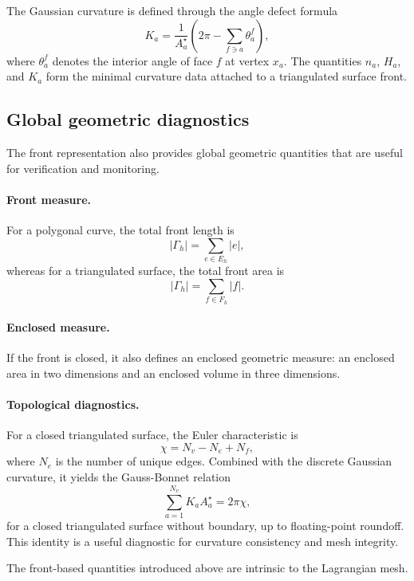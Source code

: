 \documentclass{article}
\begin{document}
The Gaussian curvature is defined through the angle defect formula
\begin{equation}
K_a
=
\frac{1}{A_a^\star}
\left(
2\pi - \sum_{f\ni a}\theta_a^f
\right),
\label{eq:gaussian_curvature}
\end{equation}
where $\theta_a^f$ denotes the interior angle of face $f$ at vertex $x_a$.
The quantities $n_a$, $H_a$, and $K_a$ form the minimal curvature data attached
to a triangulated surface front.

\subsection{Global geometric diagnostics}
\label{subsec:front_diagnostics}

The front representation also provides global geometric quantities that are useful
for verification and monitoring.

\paragraph{Front measure.}
For a polygonal curve, the total front length is
\begin{equation}
|\Gamma_h| = \sum_{e\in E_h} |e|,
\label{eq:front_length}
\end{equation}
whereas for a triangulated surface, the total front area is
\begin{equation}
|\Gamma_h| = \sum_{f\in F_h} |f|.
\label{eq:front_area}
\end{equation}

\paragraph{Enclosed measure.}
If the front is closed, it also defines an enclosed geometric measure:
an enclosed area in two dimensions and an enclosed volume in three dimensions.


\paragraph{Topological diagnostics.}
For a closed triangulated surface, the Euler characteristic is
\begin{equation}
\chi = N_v - N_e + N_f,
\label{eq:euler_characteristic}
\end{equation}
where $N_e$ is the number of unique edges.
Combined with the discrete Gaussian curvature, it yields the Gauss-Bonnet relation
\begin{equation}
\sum_{a=1}^{N_v} K_a A_a^\star = 2\pi \chi,
\label{eq:gauss_bonnet}
\end{equation}
for a closed triangulated surface without boundary, up to floating-point roundoff.
This identity is a useful diagnostic for curvature consistency and mesh integrity.

The front-based quantities introduced above are intrinsic to the Lagrangian mesh. 





\end{document}
